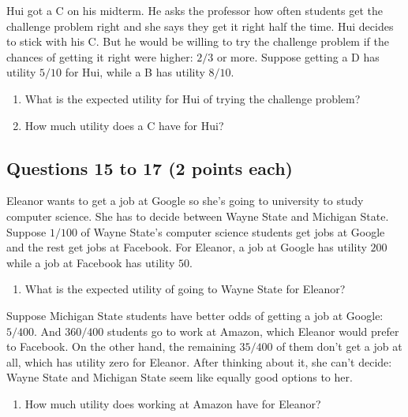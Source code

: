 \documentclass[11pt,]{article}
\providecommand{\tightlist}{%
  \setlength{\itemsep}{0pt}\setlength{\parskip}{0pt}}
\begin{document}
Hui got a C on his midterm. He asks the professor how often students get
the challenge problem right and she says they get it right half the
time. Hui decides to stick with his C. But he would be willing to try
the challenge problem if the chances of getting it right were higher:
\(2/3\) or more. Suppose getting a D has utility \(5/10\) for Hui, while
a B has utility \(8/10\).

\begin{enumerate}
\def\labelenumi{\arabic{enumi}.}
\setcounter{enumi}{12}
\tightlist
\item
  What is the expected utility for Hui of trying the challenge problem?
\item
  How much utility does a C have for Hui?
\end{enumerate}

\hypertarget{questions-15-to-17-2-points-each}{%
\subsection{Questions 15 to 17 (2 points
each)}\label{questions-15-to-17-2-points-each}}

Eleanor wants to get a job at Google so she's going to university to
study computer science. She has to decide between Wayne State and
Michigan State. Suppose \(1/100\) of Wayne State's computer science
students get jobs at Google and the rest get jobs at Facebook. For
Eleanor, a job at Google has utility \(200\) while a job at Facebook has
utility \(50\).

\begin{enumerate}
\def\labelenumi{\arabic{enumi}.}
\setcounter{enumi}{14}
\tightlist
\item
  What is the expected utility of going to Wayne State for Eleanor?
\end{enumerate}

Suppose Michigan State students have better odds of getting a job at
Google: \(5/400\). And \(360/400\) students go to work at Amazon, which
Eleanor would prefer to Facebook. On the other hand, the remaining
\(35/400\) of them don't get a job at all, which has utility zero for
Eleanor. After thinking about it, she can't decide: Wayne State and
Michigan State seem like equally good options to her.

\begin{enumerate}
\def\labelenumi{\arabic{enumi}.}
\setcounter{enumi}{15}
\tightlist
\item
  How much utility does working at Amazon have for Eleanor?
\end{enumerate}
\end{document}
